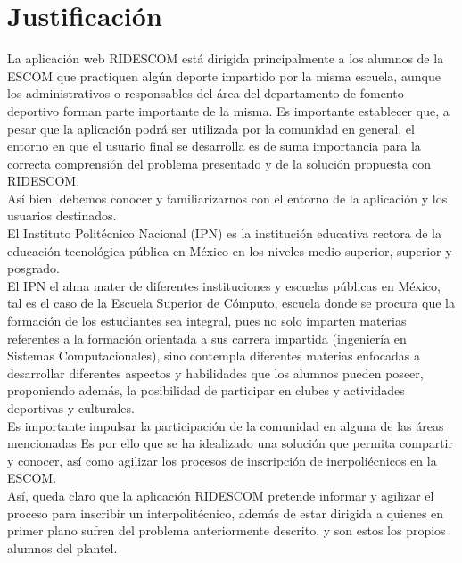 	\section{Justificaci\'on}
	La aplicación web RIDESCOM está dirigida principalmente a los alumnos de la ESCOM que practiquen algún deporte impartido por la misma escuela, aunque los administrativos o responsables del área del departamento de fomento deportivo forman parte importante de la misma. Es importante establecer que, a pesar que la aplicación podrá ser utilizada por la comunidad en general,  el entorno en que el usuario final se desarrolla es de suma importancia para la correcta comprensión del problema presentado y de la solución propuesta con RIDESCOM.\\ 
	Así bien, debemos conocer y familiarizarnos con el entorno de la aplicación y los usuarios destinados. \\
	El Instituto Politécnico Nacional (IPN) es la institución educativa rectora de la educación tecnológica pública en México en los niveles medio superior, superior y posgrado. \cite{hist} \\
	
	El IPN el alma mater de diferentes instituciones y escuelas públicas en México, tal es el caso de la Escuela Superior de Cómputo, escuela donde se procura que la formación de los estudiantes sea integral, pues no solo imparten materias referentes a la formación orientada a sus carrera impartida (ingeniería en Sistemas Computacionales), sino contempla diferentes materias enfocadas a desarrollar diferentes aspectos y habilidades que los alumnos pueden poseer, proponiendo además, la posibilidad de participar en clubes y actividades deportivas y culturales. \\ 
	Es importante impulsar la participación de la comunidad en alguna de las áreas mencionadas 
	Es por ello que se ha idealizado una solución que permita compartir y conocer, así como agilizar los procesos de inscripción de inerpoliécnicos en la ESCOM.\\ %
	Así, queda claro que la aplicación RIDESCOM pretende informar y agilizar el proceso para inscribir un interpolitécnico, además de estar dirigida a quienes en primer plano sufren del problema anteriormente descrito, y son estos los propios alumnos del plantel.
	
